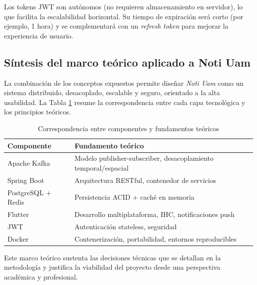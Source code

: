 Los tokens JWT son autónomos (no requieren almacenamiento en servidor), lo que facilita la escalabilidad horizontal. Su tiempo de expiración será corto (por ejemplo, 1 hora) y se complementará con un \textit{refresh token} para mejorar la experiencia de usuario.

\subsection{Síntesis del marco teórico aplicado a Noti Uam}

La combinación de los conceptos expuestos permite diseñar \textit{Noti Uam} como un sistema distribuido, desacoplado, escalable y seguro, orientado a la alta usabilidad. La Tabla \ref{tab:marco} resume la correspondencia entre cada capa tecnológica y los principios teóricos.

\begin{table}[H]
\centering
\small
\begin{tabular}{|l|p{7.5cm}|}
\hline
\textbf{Componente} & \textbf{Fundamento teórico} \\
\hline
Apache Kafka & Modelo publisher-subscriber, desacoplamiento temporal/espacial \\
\hline
Spring Boot & Arquitectura RESTful, contenedor de servicios \\
\hline
PostgreSQL + Redis & Persistencia ACID + caché en memoria \\
\hline
Flutter & Desarrollo multiplataforma, IHC, notificaciones push \\
\hline
JWT & Autenticación stateless, seguridad \\
\hline
Docker & Contenerización, portabilidad, entornos reproducibles \\
\hline
\end{tabular}
\caption{Correspondencia entre componentes y fundamentos teóricos}
\label{tab:marco}
\end{table}

Este marco teórico sustenta las decisiones técnicas que se detallan en la metodología y justifica la viabilidad del proyecto desde una perspectiva académica y profesional.